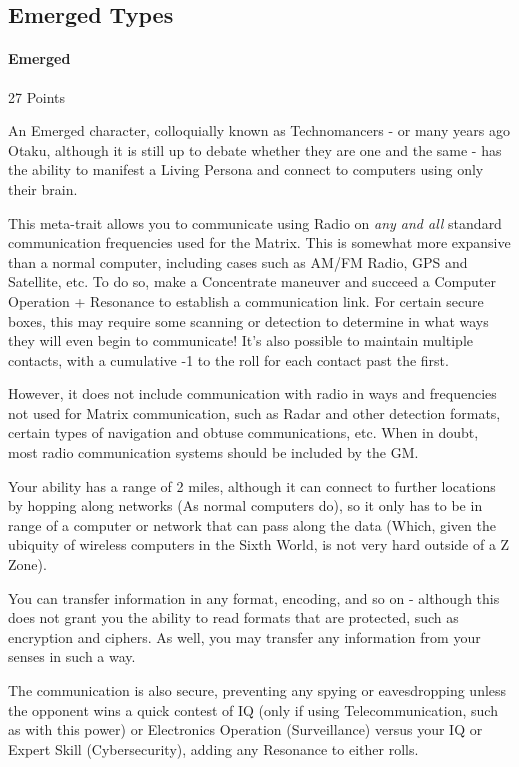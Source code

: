 \begin{multicols*}{3}
	\subsection{Emerged Types}
	
	\paragraph{Emerged}\label{emerged}
	\begin{flushright}
		27 Points
	\end{flushright}
	
	An Emerged character, colloquially known as Technomancers - or many years ago Otaku, although it is still up to debate whether they are one and the same - has the ability to manifest a Living Persona and connect to computers using only their brain.
	
	This meta-trait allows you to communicate using Radio on \textit{any and all} standard communication frequencies used for the Matrix. This is somewhat more expansive than a normal computer, including cases such as AM/FM Radio, GPS and Satellite, etc. To do so, make a Concentrate maneuver and succeed a Computer Operation + Resonance  to establish a communication link. For certain secure boxes, this may require some scanning or detection to determine in what ways they will even begin to communicate! It's also possible to maintain multiple contacts, with a cumulative -1 to the roll for each contact past the first.
	
	However, it does not include communication with radio in ways and frequencies not used for Matrix communication, such as Radar and other detection formats, certain types of navigation and obtuse communications, etc. When in doubt, most radio communication systems should be included by the GM.
	
	Your ability has a range of 2 miles, although it can connect to further locations by hopping along networks (As normal computers do), so it only has to be in range of a computer or network that can pass along the data (Which, given the ubiquity of wireless computers in the Sixth World, is not very hard outside of a Z Zone).
	
	You can transfer information in any format, encoding, and so on - although this does not grant you the ability to read formats that are protected, such as encryption and ciphers. As well, you may transfer any information from your senses in such a way.
	
	The communication is also secure, preventing any spying or eavesdropping unless the opponent wins a quick contest of IQ (only if using Telecommunication, such as with this power) or Electronics Operation (Surveillance) versus your IQ or Expert Skill (Cybersecurity), adding any Resonance to either rolls.
	

\end{multicols*}
